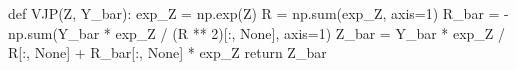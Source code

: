 \documentclass[12pt]{article}%
\begin{document}
\begin{python}
def VJP(Z, Y_bar):
    exp_Z = np.exp(Z)
    R = np.sum(exp_Z, axis=1)
    R_bar = -np.sum(Y_bar * exp_Z / (R ** 2)[:, None], axis=1)
    Z_bar = Y_bar * exp_Z / R[:, None] + R_bar[:, None] * exp_Z
    return Z_bar
\end{python}

 





\end{document}
